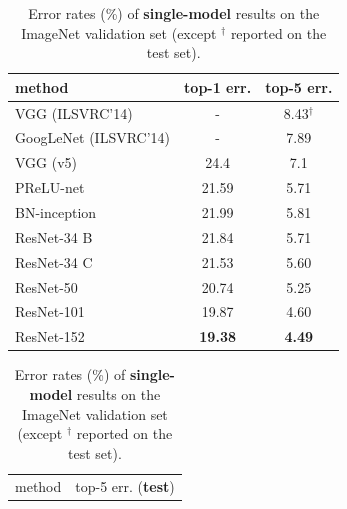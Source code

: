 \documentclass[10pt,twocolumn,letterpaper]{article}
\begin{document}
\begin{table}[t]
  \setlength{\tabcolsep}{8pt}
  \small
  \begin{center}
    \begin{tabular}{l|c c}
      \hline
      \footnotesize method                       & \footnotesize top-1 err. & \footnotesize top-5 err. \\
      \hline
      VGG \cite{Simonyan2015} (ILSVRC'14)        & -                        & 8.43$^{\dag}$            \\
      GoogLeNet \cite{Szegedy2015} (ILSVRC'14)   & -                        & 7.89                     \\
      \hline
      VGG \cite{Simonyan2015} \footnotesize (v5) & 24.4                     & 7.1                      \\
      PReLU-net \cite{He2015}                    & 21.59                    & 5.71                     \\
      BN-inception \cite{Ioffe2015}              & 21.99                    & 5.81                     \\\hline
      ResNet-34 B                                & 21.84                    & 5.71                     \\
      ResNet-34 C                                & 21.53                    & 5.60                     \\
      ResNet-50                                  & 20.74                    & 5.25                     \\
      ResNet-101                                 & 19.87                    & 4.60                     \\
      ResNet-152                                 & \textbf{19.38}           & \textbf{4.49}            \\
      \hline
    \end{tabular}
  \end{center}
  \vspace{-.5em}
  \caption{Error rates (\%) of \textbf{single-model} results on the ImageNet validation set (except $^{\dag}$ reported on the test set).}
  \label{tab:single}
  \setlength{\tabcolsep}{12pt}
  \small
  \begin{center}
    \begin{tabular}{l|c}
      \hline
      \footnotesize method                       & top-5 err. (\textbf{test}) \\

\end{tabular}
\end{center}
\end{table}
\end{document}
